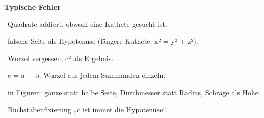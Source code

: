 \documentclass[11pt]{article}
\begin{document}
\pfheftstil
{}
{\small\noindent\textbf{Typische Fehler}\par\smallskip\noindent \textbullet\ Quadrate addiert, obwohl eine Kathete gesucht ist.\par\noindent \textbullet\ falsche Seite als Hypotenuse (längere Kathete; x² = y² + z²).\par\noindent \textbullet\ Wurzel vergessen, c² als Ergebnis.\par\noindent \textbullet\ c = a + b; Wurzel aus jedem Summanden einzeln.\par\noindent \textbullet\ in Figuren: ganze statt halbe Seite, Durchmesser statt Radius, Schräge als Höhe.\par\noindent \textbullet\ Buchstabenfixierung „c ist immer die Hypotenuse“.\par}\medskip
\begin{pfloesung}{}
\end{pfloesung}
\begin{pfloesung}{}
\end{pfloesung}
\begin{pfloesung}{}
\end{pfloesung}
\begin{pfloesung}{}
\end{pfloesung}
\begin{pfloesung}{}
\end{pfloesung}
\begin{pfloesung}{}
\end{pfloesung}
\begin{pfloesung}{}
\end{pfloesung}
\begin{pfloesung}{}
\end{pfloesung}
\begin{pfloesung}{}
\end{pfloesung}
\begin{pfloesung}{}
\end{pfloesung}
\end{document}

